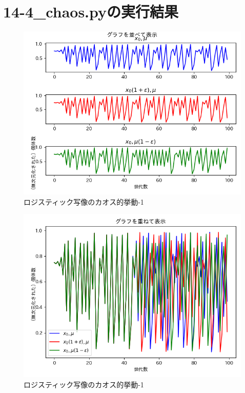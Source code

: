 \documentclass[a4paper, oneside]{jsarticle}
\begin{document}
\section{14-4\_chaos.pyの実行結果}

\begin{figure}[h]
  \centering
  \includegraphics[width=150mm]{chaos-parallel.png}
    \caption{ロジスティック写像のカオス的挙動-1}
    \label{fig:chaos-parallel}
\end{figure}
\begin{figure}[h]
  \centering
  \includegraphics[width=150mm]{chaos-overlap.png}
    \caption{ロジスティック写像のカオス的挙動-1}
    \label{fig:chaos-overlap}
\end{figure}
\end{document}
